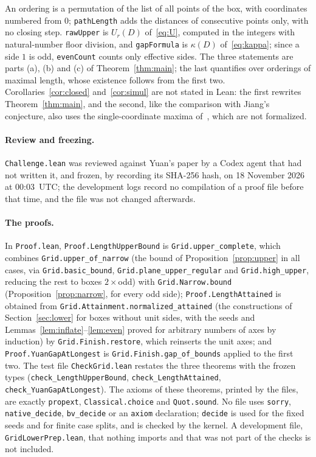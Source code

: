 \documentclass[11pt]{article}
\theoremstyle{remark}
\begin{document}
\noindent An ordering is a permutation of the list of all points of the box,
with coordinates numbered from $0$; \texttt{pathLength} adds the distances of
consecutive points only, with no closing step. \texttt{rawUpper} is
$U_r(D)$ of~\eqref{eq:U}, computed in the integers with natural-number floor
division, and \texttt{gapFormula} is $\kappa(D)$ of~\eqref{eq:kappa}; since a
side $1$ is odd, \texttt{evenCount} counts only effective sides. The three
statements are parts (a), (b) and (c) of Theorem~\ref{thm:main}; the last
quantifies over orderings of maximal length, whose existence follows from the
first two. Corollaries~\ref{cor:closed} and~\ref{cor:simul} are not stated in Lean: the first rewrites Theorem~\ref{thm:main}, and the second, like the comparison with Jiang's conjecture, also uses the single-coordinate maxima of~\cite[Theorem~2.3]{yuan}, which are not formalized.

\paragraph{Review and freezing.}
\texttt{Challenge.lean} was reviewed against Yuan's paper by a Codex agent that
had not written it, and frozen, by recording its SHA-256 hash, on 18 November
2026 at 00:03~UTC; the development logs record no compilation of a proof file
before that time, and the file was not changed afterwards.

\paragraph{The proofs.}
In \texttt{Proof.lean}, \texttt{Proof.LengthUpperBound} is
\texttt{Grid.upper\_\allowbreak complete}, which combines
\texttt{Grid.upper\_\allowbreak of\_\allowbreak narrow} (the bound of
Proposition~\ref{prop:upper} in all cases, via
\texttt{Grid.basic\_\allowbreak bound}, \texttt{Grid.plane\_\allowbreak upper\_\allowbreak regular}
and \texttt{Grid.high\_\allowbreak upper}, reducing the rest to boxes $2\times$odd)
with \texttt{Grid.Narrow.bound} (Proposition~\ref{prop:narrow}, for every odd
side);
\texttt{Proof.LengthAttained} is obtained from
\texttt{Grid.Attainment.normalized\_\allowbreak attained} (the constructions of
Section~\ref{sec:lower} for boxes without unit sides, with the seeds and
Lemmas~\ref{lem:inflate}--\ref{lem:even} proved for arbitrary numbers of axes
by induction) by \texttt{Grid.Finish.restore}, which reinserts the unit axes;
and \texttt{Proof.YuanGapAtLongest} is
\texttt{Grid.Finish.gap\_\allowbreak of\_\allowbreak bounds} applied to the first
two. The test file \texttt{CheckGrid.lean} restates the three theorems with
the frozen types (\texttt{check\_\allowbreak LengthUpperBound},
\texttt{check\_\allowbreak LengthAttained},
\texttt{check\_\allowbreak YuanGapAtLongest}). The axioms of these theorems,
printed by the files, are exactly \texttt{propext}, \texttt{Classical.choice}
and \texttt{Quot.sound}. No file uses \texttt{sorry},
\texttt{native\_\allowbreak decide}, \texttt{bv\_\allowbreak decide} or an
\texttt{axiom} declaration; \texttt{decide} is used for the fixed seeds and for
finite case splits, and is checked by the kernel. A development file,
\texttt{GridLowerPrep.lean}, that nothing imports and that was not part of the
checks is not included.
\end{document}
